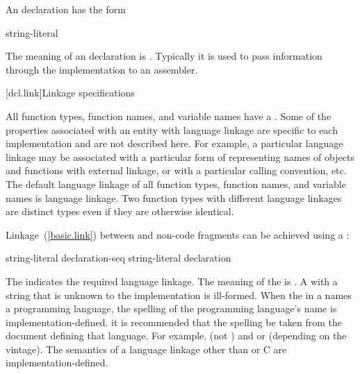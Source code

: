\pnum
An  declaration has the form

\begin{bnf}
\br
     string-literal \terminal{) ;}
\end{bnf}

The meaning of an  declaration is
.
\enternote
Typically it is used to pass information through the implementation to
an assembler.
\exitnote

[dcl.link]{Linkage specifications}%

\pnum
All function types, function names, and variable
names have a .
\enternote
Some of the properties associated with an entity with language linkage
are specific to each implementation and are not described here. For
example, a particular language linkage may be associated with a
particular form of representing names of objects and functions with
external linkage, or with a particular calling convention, etc.
\exitnote
The default language linkage of all function types, function names, and
variable names is \Cpp language linkage. Two function types with
different language linkages are distinct types even if they are
otherwise identical.

\pnum
Linkage~(\ref{basic.link}) between \Cpp and  non-\Cpp code fragments can
be achieved using a :

%
%
%
\begin{bnf}
\br
     string-literal \terminal{\{} declaration-seq\opt \terminal{\}}\br
     string-literal declaration
\end{bnf}

The  indicates the required language linkage.
The meaning of the  is
.
A  with a string that is unknown to the
implementation is ill-formed. When the  in a
 names a programming language, the
spelling of the programming language's name is implementation-defined.
\enternote
it is recommended that the spelling be
taken from the document defining that language. For example, 
(not ) and  or  (depending on
the vintage). The semantics of a language linkage other than \Cpp or C
are implementation-defined.
\exitnote

